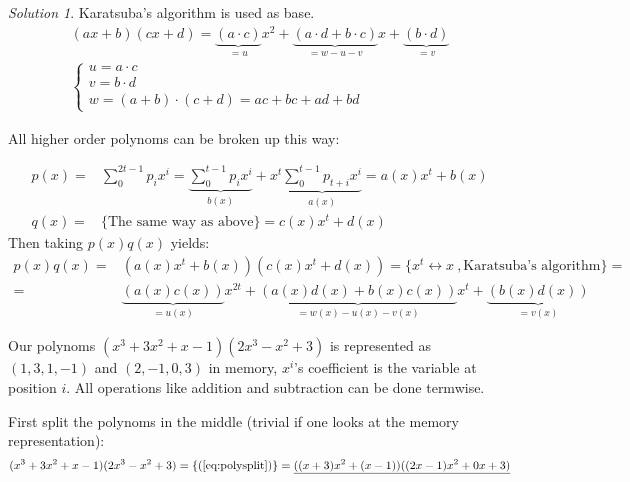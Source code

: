 \documentclass[a4paper,twoside=false,abstract=false,numbers=noenddot,
titlepage=false,headings=small,parskip=half,version=last]{scrartcl}
\theoremstyle{definition}
\theoremstyle{remark}
\newtheorem*{solution}{Solution}
\begin{document}
\begin{solution}

Karatsuba's algorithm is used as base.
\begin{equation} \label{eq:karatsuba}
\begin{split}    
    (ax+b)(cx+d) = \underbrace{(a \cdot c)}_{=u}x^2+\underbrace{(a \cdot d+b
    \cdot c)}_{=w-u-v}x+\underbrace{(b \cdot d)}_{=v} \\
    \begin{cases}
        u=a \cdot c \\
        v=b \cdot d \\
        w=(a+b)\cdot (c+d) = ac+bc+ad+bd
    \end{cases}
\end{split}
\end{equation}

All higher order polynoms can be broken up this way:

\begin{equation} \label{eq:polysplit}
\begin{split}
    p(x) = & \sum_0^{2t-1}p_ix^i
    =\underbrace{\sum_0^{t-1}p_ix^i}_{b(x)}
    +x^t\underbrace{\sum_0^{t-1}p_{t+i}x^i}_{a(x)}
    =a(x)x^t+b(x) \\
    q(x) = & \{\mbox{The same way as above}\} = c(x)x^t+d(x)
\end{split}
\end{equation}
Then taking $p(x)q(x)$ yields:
\begin{equation}
\begin{split}
    p(x)q(x) = & (a(x)x^t+b(x))(c(x)x^t+d(x))= \{x^t \leftrightarrow x \ ,\mbox{
    Karatsuba's algorithm}\} = \\
    = & \underbrace{(a(x)c(x))}_{=u(x)}x^{2t}
    +\underbrace{(a(x)d(x)+b(x)c(x))}_{=w(x)-u(x)-v(x)}x^t
    +\underbrace{(b(x)d(x))}_{=v(x)}
\end{split}
\end{equation}

Our polynoms $(x^3+3x^2+x-1)(2x^3-x^2+3)$ is represented as $(1,3,1,-1)$ and
$(2,-1,0,3)$ in memory, $x^i$'s coefficient is the variable at position $i$.
All operations like addition and subtraction can be done termwise.

First split the polynoms in the middle (trivial if one looks at the memory
representation):
\begin{equation}
    (x^3+3x^2+x-1)(2x^3-x^2+3)=\{(\ref{eq:polysplit})\}=
    \underline{((x+3)x^2+(x-1))((2x-1)x^2+0x+3)}
\end{equation}


\end{solution}
\end{document}
